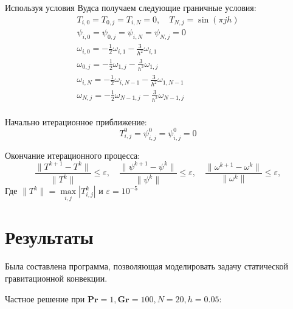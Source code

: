 \documentclass[a4paper, 12pt]{article}
\newcommand{\Pra}{\mathbf{Pr}}
\newcommand{\Gra}{\mathbf{Gr}}
\begin{document}
    Используя условия Вудса получаем следующие граничные условия:
    \begin{gather*}
      T_{i,0} = T_{0,j} = T_{i,N} = 0, \quad T_{N,j} = \sin (\pi j h)
      \\
      \psi_{i,0} = \psi_{0,j} = \psi_{i,N} = \psi_{N,j} = 0
      \\
      \omega_{i,0} = - \frac{1}{2} \omega_{i,1} - \frac{3}{h^2} \omega_{i,1}
      \\
      \omega_{0,j} = - \frac{1}{2} \omega_{1,j} - \frac{3}{h^2} \omega_{1,j}
      \\
      \omega_{i,N} = - \frac{1}{2} \omega_{i,N-1} - \frac{3}{h^2} \omega_{1,N-1}
      \\
      \omega_{N,j} = - \frac{1}{2} \omega_{N-1,j} - \frac{3}{h^2} \omega_{N-1,j}
      \\
    \end{gather*}

    Начально итерационное приближение:
    $$
      T_{i,j}^0 = \psi_{i,j}^{0} = \psi_{i,j}^{0} = 0
    $$

    Окончание итерационного процесса:
    $$
      \frac{\lVert T^{k+1} - T^k \rVert}{\lVert T^k \rVert} \leq \varepsilon,
        \quad
      \frac{\lVert \psi^{k+1} - \psi^k \rVert}{\lVert \psi^k \rVert} \leq
        \varepsilon, \quad
      \frac{\lVert \omega^{k+1} - \omega^k \rVert}{\lVert \omega^k \rVert} \leq
        \varepsilon,
    $$
    Где $\lVert T^k \rVert = \max\limits_{i,j} \left| T_{i,j}^{k} \right|$ и
    $\varepsilon = 10^{-5}$
  \pagebreak

  \section{Результаты}
    Была составлена программа, позволяющая моделировать задачу статической
    гравитационной конвекции.

    \bigskip
    Частное решение при $\Pra = 1, \Gra = 100, N = 20, h = 0.05$:
    \bigskip
\end{document}
